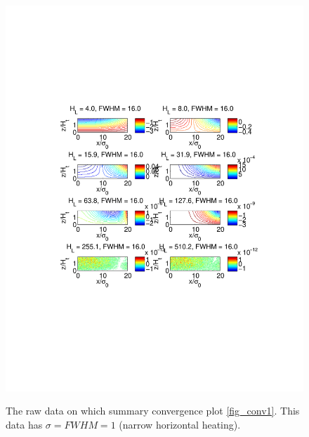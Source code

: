 \documentclass[12pt]{article}
\begin{document}
\begin{figure}[h]
\caption{The raw data on which summary convergence plot \ref{fig_conv1}. This data has $\sigma=FWHM = 1$ (narrow horizontal heating). } 
\includegraphics[scale=0.8,angle=-0] {fig4c.pdf} 
\label{fig_conv2}
\end{figure}
%
%
%
\end{document}
